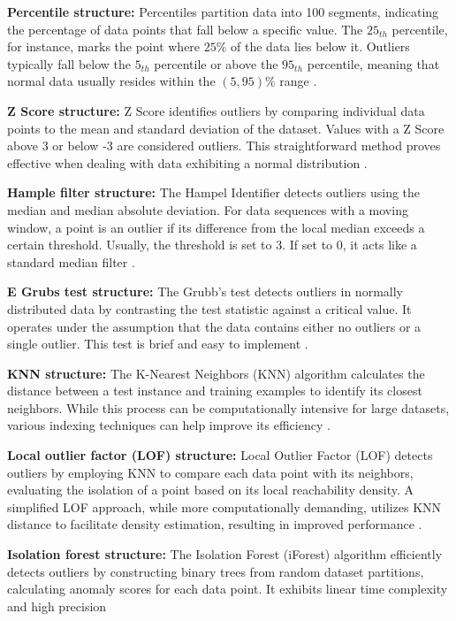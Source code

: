 \documentclass[12pt]{article}
\begin{document}
\textbf{\small Percentile structure:} Percentiles partition data
into 100 segments, indicating the percentage of data points that
fall below a specific value. The $25_{th}$ percentile, for
instance, marks the point where $25\%$ of the data lies below it.
Outliers typically fall below the $5_{th}$ percentile or above the
$95_{th}$ percentile, meaning that normal data usually resides
within the $(5, 95)\%$ range \cite{A38}.

\textbf{\small Z Score structure:} Z Score identifies outliers by
comparing individual data points to the mean and standard
deviation of the dataset. Values with a Z Score above 3 or below
-3 are considered outliers. This straightforward method proves
effective when dealing with data exhibiting a normal distribution
\cite{A38}.

\textbf{\small Hample filter structure:} The Hampel Identifier
detects outliers using the median and median absolute deviation.
For data sequences with a moving window, a point is an outlier if
its difference from the local median exceeds a certain threshold.
Usually, the threshold is set to 3. If set to 0, it acts like a
standard median filter \cite{A42}.

\textbf{\small E Grubs test structure:} The Grubb's test detects
outliers in normally distributed data by contrasting the test
statistic against a critical value. It operates under the
assumption that the data contains either no outliers or a single
outlier. This test is brief and easy to implement \cite{A44}.

\textbf{\small KNN structure:} The K-Nearest Neighbors (KNN)
algorithm calculates the distance between a test instance and
training examples to identify its closest neighbors. While this
process can be computationally intensive for large datasets,
various indexing techniques can help improve its efficiency
\cite{A46}.

\textbf{\small Local outlier factor (LOF) structure:} Local
Outlier Factor (LOF) detects outliers by employing KNN to compare
each data point with its neighbors, evaluating the isolation of a
point based on its local reachability density. A simplified LOF
approach, while more computationally demanding, utilizes KNN
distance to facilitate density estimation, resulting in improved
performance \cite{A46}.

\textbf{\small Isolation forest structure:} The Isolation Forest
(iForest) algorithm efficiently detects outliers by constructing
binary trees from random dataset partitions, calculating anomaly
scores for each data point. It exhibits linear time complexity and
high precision \cite{A52}
\end{document}
